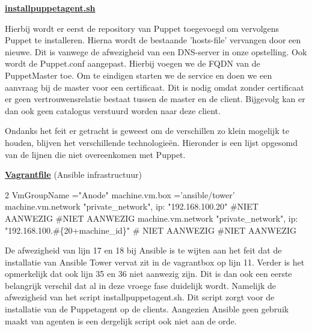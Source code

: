 \underline{\textbf{installpuppetagent.sh}} 


Hierbij wordt er eerst de repository van Puppet toegevoegd om vervolgens Puppet te installeren. Hierna wordt de bestaande 'hosts-file' vervangen  door een nieuwe. Dit is vanwege de afwezigheid van een DNS-server in onze opstelling. Ook wordt de Puppet.conf aangepast. Hierbij voegen we de FQDN van de PuppetMaster toe. Om te eindigen starten we de service en doen we een aanvraag bij de master voor een certificaat. Dit is nodig omdat zonder certificaat er geen vertrouwensrelatie bestaat tussen de master en de client. Bijgevolg kan er dan ook geen catalogus verstuurd worden naar deze client.


Ondanks het feit er getracht is geweest om de verschillen zo klein mogelijk te houden, blijven het verschillende technologie\"en. Hieronder is een lijst opgesomd van de lijnen die niet overeenkomen met Puppet.

\underline{\textbf{Vagrantfile}} (Ansible infrastructuur)\newline\newline

2 VmGroupName ="Anode"  machine.vm.box ='ansible/tower'   machine.vm.network "private\_network", ip: "192.168.100.20"   \#NIET AANWEZIG  \#NIET AANWEZIG  machine.vm.network "private\_network", ip: "192.168.100.\#\{20+machine\_id\}"    \# NIET AANWEZIG \#NIET AANWEZIG\newline

De afwezigheid van lijn 17 en 18 bij Ansible is te wijten aan het feit dat de installatie van Ansible Tower vervat zit in de vagrantbox op lijn 11. Verder is het opmerkelijk dat ook lijn 35 en 36 niet aanwezig zijn. Dit is dan ook een eerste belangrijk verschil dat al in deze vroege fase duidelijk wordt. Namelijk de afwezigheid van het script installpuppetagent.sh. Dit script zorgt voor de installatie van de Puppetagent op de clients. Aangezien Ansible geen gebruik maakt van agenten is een dergelijk script ook niet aan de orde.






















